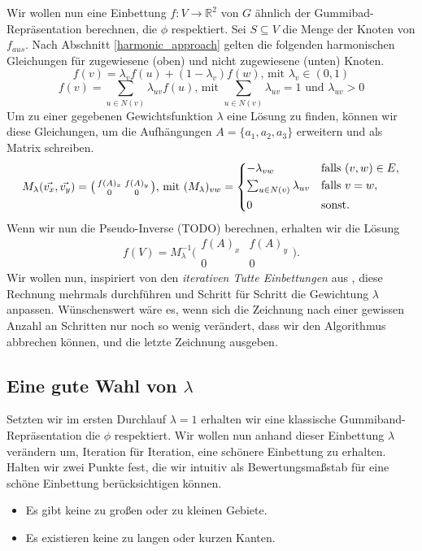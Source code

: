 Wir wollen nun eine Einbettung $f:V\to \mathbb{R}^2$ von $G$ ähnlich der Gummibad-Repräsentation berechnen, die $\phi$ respektiert. Sei $S \subseteq V$ die Menge der Knoten von $f_{aus}$. Nach Abschnitt \ref{harmonic_approach} gelten die folgenden harmonischen Gleichungen für zugewiesene (oben) und nicht zugewiesene (unten) Knoten.
$$ f(v) = \lambda_v f(u) + (1-\lambda_v)f(w) \text{, mit } \lambda_v \in (0,1) $$
$$ f(v) = \sum_{u \in N(v)} \lambda_{uv} f(u) \text{, mit }  \sum_{u \in N(v)}\lambda_{uv} = 1 \text{ und } \lambda_{uv} > 0 $$
Um zu einer gegebenen Gewichtsfunktion $\lambda$ eine Lösung zu finden, können wir diese Gleichungen, um die Aufhängungen $A = \{a_1,a_2,a_3\}$ erweitern und als Matrix schreiben.
\[ M_{\lambda}(\vec{v_x},\vec{v_y}) = \big( \begin{smallmatrix}f(A)_x&f(A)_y\\ 0&0\end{smallmatrix} \big) \text{, mit } (M_{\lambda})_{vw} =
	\begin{dcases}
	-\lambda_{vw} & \text{falls } (v,w) \in E, \\
	\textstyle\sum_{u \in N(v)} \lambda_{uv} & \text{falls } v = w, \\
	0 & \text{sonst.} \\
	\end{dcases}
\]
Wenn wir nun die Pseudo-Inverse (TODO) berechnen, erhalten wir die Lösung
$$f(V) = M_{\lambda}^{-1}\big( \begin{smallmatrix}f(A)_x&f(A)_y\\ 0&0\end{smallmatrix} \big).$$
Wir wollen nun, inspiriert von den \textit{iterativen Tutte Einbettungen} aus \cite{fs17}, diese Rechnung mehrmals durchführen und Schritt für Schritt die Gewichtung $\lambda$ anpassen. Wünschenswert wäre es, wenn sich die Zeichnung nach einer gewissen Anzahl an Schritten nur noch so wenig verändert, dass wir den Algorithmus abbrechen können, und die letzte Zeichnung ausgeben.

\subsection{Eine gute Wahl von $\lambda$}

Setzten wir im ersten Durchlauf $\lambda = 1$ erhalten wir eine klassische Gummiband-Repräsentation die $\phi$ respektiert. Wir wollen nun anhand dieser Einbettung $\lambda$ verändern um, Iteration für Iteration, eine \glqq schönere\grqq{ } Einbettung zu erhalten. Halten wir zwei Punkte fest, die wir intuitiv als Bewertungsmaßstab für eine schöne Einbettung berücksichtigen können.
\begin{itemize}
\item Es gibt keine zu großen oder zu kleinen Gebiete.
\item Es existieren keine zu langen oder kurzen Kanten.
\end{itemize}

